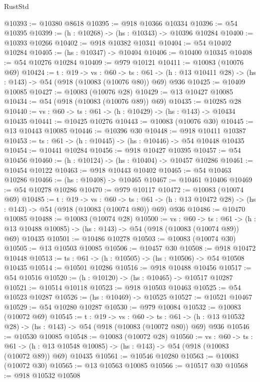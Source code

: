 \begin{lexlean}{RustStd}
\begin{coremodule}
@10393 := @10380 @8618
@10395 := @918 @10366 @10334
@10396 := @54 @10395
@10399 := (h : @10268) -> (hs : @10343) -> @10396 @10284
@10400 := @10393 @10266
@10402 := @918 @10382 @10341
@10404 := @54 @10402 @10284
@10405 := (hs : @10347) -> @10404
@10406 := @10400 @10345
@10408 := @54 @10276 @10284
@10409 := @979 @10121
@10411 := @10083 (@10076 @69)
@10424 := {t : @19} ->
  {vs : @60} ->
  {ts : @61} -> (h : @13 @10411 @28) -> (hs : @143) -> @54 (@918 (@10083 (@10076 @80)) @69) @936
@10425 := @10409 @10085
@10427 := @10083 (@10076 @28)
@10429 := @13 @10427 @10085
@10434 := @54 (@918 (@10083 (@10076 @89)) @69)
@10435 := @10285 @28
@10440 := {vs : @60} -> {ts : @61} -> (h : @10429) -> (hs : @143) -> @10434 @10435
@10441 := @10425 @10276
@10443 := @10083 (@10076 @30)
@10445 := @13 @10443 @10085
@10446 := @10396 @30
@10448 := @918 @10411 @10387
@10453 := {ts : @61} -> (h : @10445) -> (hs : @10446) -> @54 @10448 @10435
@10454 := @10441 @10284
@10456 := @918 @10427 @10395
@10457 := @54 @10456
@10460 := (h : @10124) -> (hs : @10404) -> @10457 @10286
@10461 := @10454 @10122
@10463 := @918 @10443 @10402
@10465 := @54 @10463 @10286
@10466 := (hs : @10408) -> @10465
@10467 := @10461 @10406
@10469 := @54 @10278 @10286
@10470 := @979 @10117
@10472 := @10083 (@10074 @69)
@10485 := {t : @19} ->
  {vs : @60} ->
  {ts : @61} -> (h : @13 @10472 @28) -> (hs : @143) -> @54 (@918 (@10083 (@10074 @80)) @69) @936
@10486 := @10470 @10085
@10488 := @10083 (@10074 @28)
@10500 := {vs : @60} ->
  {ts : @61} ->
  (h : @13 @10488 @10085) -> (hs : @143) -> @54 (@918 (@10083 (@10074 @89)) @69) @10435
@10501 := @10486 @10278
@10503 := @10083 (@10074 @30)
@10505 := @13 @10503 @10085
@10506 := @10457 @30
@10508 := @918 @10472 @10448
@10513 := {ts : @61} -> (h : @10505) -> (hs : @10506) -> @54 @10508 @10435
@10514 := @10501 @10286
@10516 := @918 @10488 @10456
@10517 := @54 @10516
@10520 := (h : @10120) -> (hs : @10465) -> @10517 @10287
@10521 := @10514 @10118
@10523 := @918 @10503 @10463
@10525 := @54 @10523 @10287
@10526 := (hs : @10469) -> @10525
@10527 := @10521 @10467
@10529 := @54 @10280 @10287
@10530 := @979 @10084
@10532 := @10083 (@10072 @69)
@10545 := {t : @19} ->
  {vs : @60} ->
  {ts : @61} -> (h : @13 @10532 @28) -> (hs : @143) -> @54 (@918 (@10083 (@10072 @80)) @69) @936
@10546 := @10530 @10085
@10548 := @10083 (@10072 @28)
@10560 := {vs : @60} ->
  {ts : @61} ->
  (h : @13 @10548 @10085) -> (hs : @143) -> @54 (@918 (@10083 (@10072 @89)) @69) @10435
@10561 := @10546 @10280
@10563 := @10083 (@10072 @30)
@10565 := @13 @10563 @10085
@10566 := @10517 @30
@10568 := @918 @10532 @10508

\end{coremodule}
\end{lexlean}
